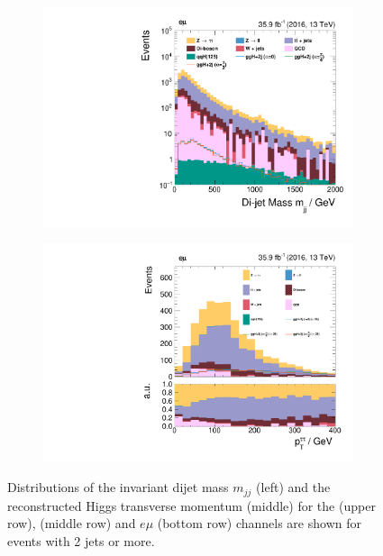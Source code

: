 \begin{figure}[h!]
\begin{subfigure}{.45\textwidth}
        \includegraphics[width=\textwidth]{Figures/eventselection/Categorization/em/mjj.pdf}
    \end{subfigure}%
    \begin{subfigure}{.49\textwidth}
        \centering
        \includegraphics[width=\textwidth]{Figures/eventselection/Categorization/em/H_pt.pdf}
    \end{subfigure} %
    \caption{Distributions of the invariant dijet mass $m_{jj}$ (left) and the reconstructed Higgs transverse momentum \ptautau{} (middle) for the \mutau{} (upper row), \etau{} (middle row) and $e\mu$ (bottom row) channels are shown for events with 2 jets or more.}\label{Supplement:ES:categorization:tt_distributions}
\end{figure}%

